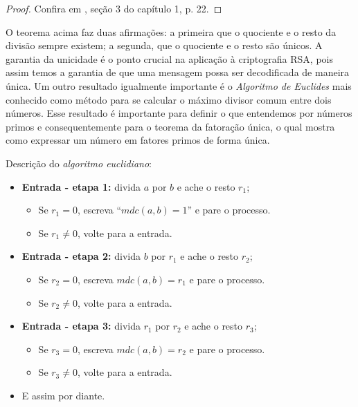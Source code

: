 \begin{proof}
Confira em \cite{cou:2014}, se\c{c}\~ao 3 do cap\'itulo 1, p. 22.
\end{proof}

O teorema acima faz duas afirma\c{c}\~oes: a primeira que o quociente e o resto da divis\~ao sempre existem; a segunda, que o quociente e o resto s\~ao \'unicos. A garantia da unicidade \'e o ponto crucial na aplica\c{c}\~ao \`a criptografia RSA, pois assim temos a garantia de que uma mensagem possa ser decodificada de maneira \'unica. Um outro resultado 
igualmente importante \'e o \textit{Algoritmo de Euclides} mais conhecido como m\'etodo para se calcular o m\'aximo divisor comum entre dois 
n\'umeros. Esse resultado \'e importante para definir o que entendemos por n\'umeros primos e consequentemente para o teorema da fatora\c{c}\~ao \'unica, o qual mostra como expressar um n\'umero em fatores primos de forma \'unica. 

Descri\c{c}\~{a}o do \textit{algoritmo euclidiano}: 

\begin{itemize}
		\item \textbf{Entrada - etapa 1:} divida $a$ por $b$ e ache o resto $r_{1}$;
						\begin{itemize}
								\item Se $r_{1}=0$, escreva ``$mdc(a,b)=1$'' e pare o processo.
								\item Se $r_{1}\neq 0$, volte para a entrada.
						\end{itemize}
		\item \textbf{Entrada - etapa 2:} divida $b$ por $r_{1}$ e ache o resto $r_{2}$;  
						\begin{itemize}
								\item Se $r_{2}=0$, escreva $mdc(a,b)=r_{1}$ e pare o processo.
								\item Se $r_{2}\neq 0$, volte para a entrada.
						\end{itemize}
		\item \textbf{Entrada - etapa 3:} divida $r_{1}$ por $r_{2}$ e ache o resto $r_{3}$;
					\begin{itemize}
								\item Se $r_{3}=0$, escreva $mdc(a,b)=r_{2}$ e pare o processo.
								\item Se $r_{3}\neq 0$, volte para a entrada.
					\end{itemize}
		\item E assim por diante.
\end{itemize}

